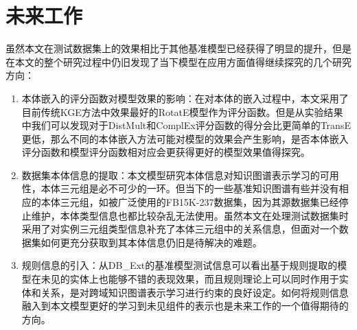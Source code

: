 \section{未来工作}
虽然本文在测试数据集上的效果相比于其他基准模型已经获得了明显的提升，但是在本文的整个研究过程中仍旧发现了当下模型在应用方面值得继续探究的几个研究方向：
\begin{enumerate}[label=\arabic*)]
  \item 本体嵌入的评分函数对模型效果的影响：在对本体的嵌入过程中，本文采用了目前传统KGE方法中效果最好的RotatE模型作为评分函数。但是从实验结果中我们可以发现对于DistMult和ComplEx评分函数的得分会比更简单的TransE更低，那么不同的本体嵌入方法可能对模型的效果会产生影响，是否本体嵌入评分函数和模型评分函数相对应会更获得更好的模型效果值得探究。
  \item 数据集本体信息的提取：本文模型研究本体信息对知识图谱表示学习的可用性，本体三元组是必不可少的一环。但当下的一些基准知识图谱有些并没有相应的本体三元组，如被广泛使用的FB15K-237数据集，因为其源数据集已经停止维护，本体类型信息也都比较杂乱无法使用。虽然本文在处理测试数据集时采用了对实例三元组类型信息补充了本体三元组中的关系信息，但面对一个数据集如何更充分获取到其本体信息仍旧是待解决的难题。
  \item 规则信息的引入：从DB\_Ext的基准模型测试信息可以看出基于规则提取的模型在未见的实体上也能够不错的表现效果，而且规则理论上可以同时作用于实体和关系，是对跨域知识图谱表示学习进行约束的良好设定。如何将规则信息融入到本文模型更好的学习到未见组件的表示也是未来工作的一个值得期待的方向。
\end{enumerate}